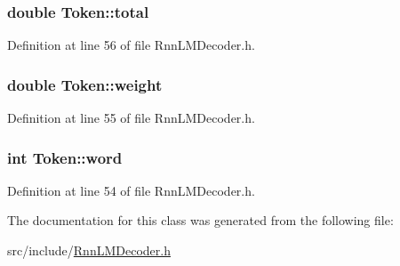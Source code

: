 \subsubsection[{total}]{\setlength{\rightskip}{0pt plus 5cm}double Token\+::total\hspace{0.3cm}{\ttfamily [mutable]}}\hypertarget{class_token_a7defe8a70425877b199e9b6db3c3d3cd}{}\label{class_token_a7defe8a70425877b199e9b6db3c3d3cd}


Definition at line 56 of file Rnn\+L\+M\+Decoder.\+h.

\subsubsection[{weight}]{\setlength{\rightskip}{0pt plus 5cm}double Token\+::weight\hspace{0.3cm}{\ttfamily [mutable]}}\hypertarget{class_token_ae1b01f3086ba1fba7525f4a6e14985c4}{}\label{class_token_ae1b01f3086ba1fba7525f4a6e14985c4}


Definition at line 55 of file Rnn\+L\+M\+Decoder.\+h.

\subsubsection[{word}]{\setlength{\rightskip}{0pt plus 5cm}int Token\+::word}\hypertarget{class_token_a4b4d79b1fee628f9c1196b21af3a3db1}{}\label{class_token_a4b4d79b1fee628f9c1196b21af3a3db1}


Definition at line 54 of file Rnn\+L\+M\+Decoder.\+h.



The documentation for this class was generated from the following file\+:\begin{DoxyCompactItemize}
\item 
src/include/\hyperlink{_rnn_l_m_decoder_8h}{Rnn\+L\+M\+Decoder.\+h}\end{DoxyCompactItemize}

